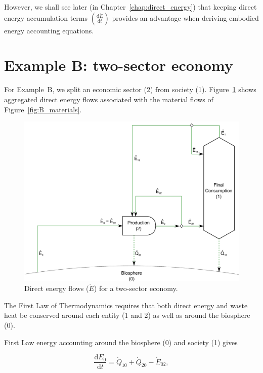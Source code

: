 However, we shall see later (in Chapter~\ref{chap:direct_energy}) 
that keeping direct energy accumulation terms
$\left( \frac{\mathrm{d}\dot{E}}{\mathrm{d}t} \right)$ 
provides an advantage when deriving embodied energy accounting equations.


\section{Example B: two-sector economy} %
\label{sec:B_energy}

For Example~B, we split an economic sector (2) from 
society (1). Figure~\ref{fig:B_energy} shows aggregated
direct energy flows associated with the material flows of Figure~\ref{fig:B_materials}.

\begin{figure}[!ht]
\centering
\includegraphics[width=0.8\linewidth]{Part_1/Chapter_Energy/images/2_sector_direct_energy.pdf}
\caption[Direct energy flows for a two-sector economy]{Direct energy flows ($\dot{E}$) for a two-sector economy.}
\label{fig:B_energy}
\end{figure}

The First Law of Thermodynamics
requires that both 
direct energy and 
waste heat 
be conserved around each 
entity (1 and 2) as well as around the biosphere (0).

First Law energy accounting around the biosphere (0) and society (1) gives

\begin{equation} \label{eq:CV_E_dot_0}
	\frac{\mathrm{d}E_{0}}{\mathrm{d}t} 	 
	= \dot{Q}_{10} 
	+ \dot{Q}_{20} 
	- \dot{E}_{02},
\end{equation}


